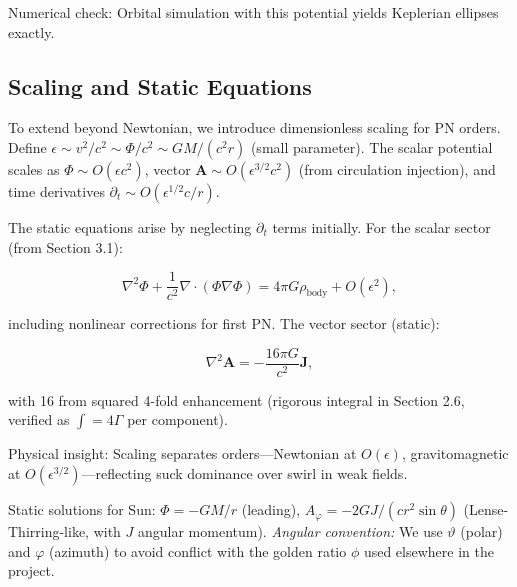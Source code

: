 
Numerical check: Orbital simulation with this potential yields Keplerian ellipses exactly.

\medskip
\noindent
{}
\medskip

\subsection{Scaling and Static Equations}

To extend beyond Newtonian, we introduce dimensionless scaling for PN orders. Define $\epsilon \sim v^2 / c^2 \sim \Phi / c^2 \sim G M / (c^2 r)$ (small parameter). The scalar potential scales as $\Phi \sim O(\epsilon c^2)$, vector $\mathbf{A} \sim O(\epsilon^{3/2} c^2)$ (from circulation injection), and time derivatives $\partial_t \sim O(\epsilon^{1/2} c / r)$.

The static equations arise by neglecting $\partial_t$ terms initially. For the scalar sector (from Section 3.1):

\[
\nabla^2 \Phi + \frac{1}{c^2} \nabla \cdot (\Phi \nabla \Phi) = 4\pi G \rho_{\text{body}} + O(\epsilon^2),
\]

including nonlinear corrections for first PN. The vector sector (static):

\[
\nabla^2 \mathbf{A} = -\frac{16\pi G}{c^2} \mathbf{J},
\]

with 16 from squared 4-fold enhancement (rigorous integral in Section 2.6, verified as $\int = 4 \Gamma$ per component).

Physical insight: Scaling separates orders—Newtonian at $O(\epsilon)$, gravitomagnetic at $O(\epsilon^{3/2})$—reflecting suck dominance over swirl in weak fields.

Static solutions for Sun: $\Phi = -G M / r$ (leading), $A_\varphi = -2 G J / (c r^2 \sin \theta)$ (Lense-Thirring-like, with $J$ angular momentum).
\noindent\emph{Angular convention:} We use $\vartheta$ (polar) and $\varphi$ (azimuth) to avoid conflict with the golden ratio $\phi$ used elsewhere in the project.

